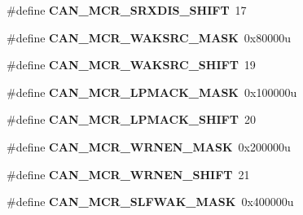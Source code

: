 \begin{DoxyCompactItemize}
\item 
\#define {\bfseries C\+A\+N\+\_\+\+M\+C\+R\+\_\+\+S\+R\+X\+D\+I\+S\+\_\+\+S\+H\+I\+FT}~17\hypertarget{group__CAN__Register__Masks_gae2513ad87a72bc6f2bb88be59a3e0836}{}\label{group__CAN__Register__Masks_gae2513ad87a72bc6f2bb88be59a3e0836}

\item 
\#define {\bfseries C\+A\+N\+\_\+\+M\+C\+R\+\_\+\+W\+A\+K\+S\+R\+C\+\_\+\+M\+A\+SK}~0x80000u\hypertarget{group__CAN__Register__Masks_ga17c7cd88f6b2d344709e803f78d1b2f4}{}\label{group__CAN__Register__Masks_ga17c7cd88f6b2d344709e803f78d1b2f4}

\item 
\#define {\bfseries C\+A\+N\+\_\+\+M\+C\+R\+\_\+\+W\+A\+K\+S\+R\+C\+\_\+\+S\+H\+I\+FT}~19\hypertarget{group__CAN__Register__Masks_gafb165acf36a8a28e351cbaef2adb11b6}{}\label{group__CAN__Register__Masks_gafb165acf36a8a28e351cbaef2adb11b6}

\item 
\#define {\bfseries C\+A\+N\+\_\+\+M\+C\+R\+\_\+\+L\+P\+M\+A\+C\+K\+\_\+\+M\+A\+SK}~0x100000u\hypertarget{group__CAN__Register__Masks_ga599f0c162d665f019269aace68e3fb17}{}\label{group__CAN__Register__Masks_ga599f0c162d665f019269aace68e3fb17}

\item 
\#define {\bfseries C\+A\+N\+\_\+\+M\+C\+R\+\_\+\+L\+P\+M\+A\+C\+K\+\_\+\+S\+H\+I\+FT}~20\hypertarget{group__CAN__Register__Masks_ga3bd209cf2829ba4c96fc00ec18c6e2d6}{}\label{group__CAN__Register__Masks_ga3bd209cf2829ba4c96fc00ec18c6e2d6}

\item 
\#define {\bfseries C\+A\+N\+\_\+\+M\+C\+R\+\_\+\+W\+R\+N\+E\+N\+\_\+\+M\+A\+SK}~0x200000u\hypertarget{group__CAN__Register__Masks_ga235a7c2b04cfd0765fa2a9313fc1fcd1}{}\label{group__CAN__Register__Masks_ga235a7c2b04cfd0765fa2a9313fc1fcd1}

\item 
\#define {\bfseries C\+A\+N\+\_\+\+M\+C\+R\+\_\+\+W\+R\+N\+E\+N\+\_\+\+S\+H\+I\+FT}~21\hypertarget{group__CAN__Register__Masks_ga728f73a79721a9cc4b1b82ce6eaa74a7}{}\label{group__CAN__Register__Masks_ga728f73a79721a9cc4b1b82ce6eaa74a7}

\item 
\#define {\bfseries C\+A\+N\+\_\+\+M\+C\+R\+\_\+\+S\+L\+F\+W\+A\+K\+\_\+\+M\+A\+SK}~0x400000u\hypertarget{group__CAN__Register__Masks_gacf4f1d3d5d5eccf0f03f5f5ed4dc1bba}{}\label{group__CAN__Register__Masks_gacf4f1d3d5d5eccf0f03f5f5ed4dc1bba}


\end{DoxyCompactItemize}

